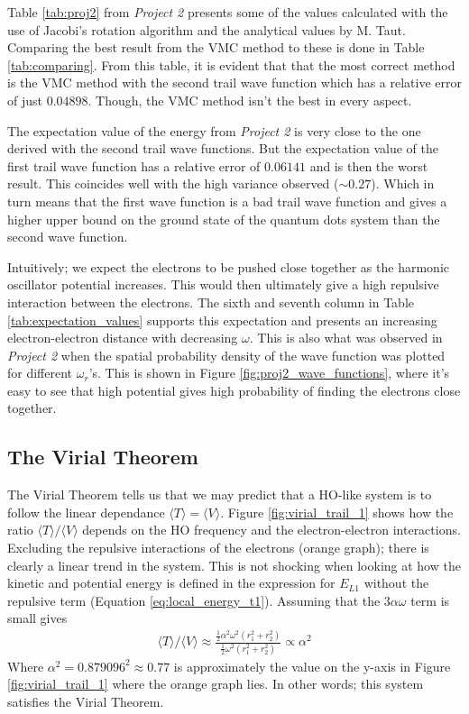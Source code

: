 \documentclass[12pt,english,a4paper]{article}
\begin{document}
Table \ref{tab:proj2} from \textit{Project 2} presents some of the values calculated with the use of Jacobi's rotation algorithm and the analytical values by M. Taut. Comparing the best result from the VMC method to these is done in Table \ref{tab:comparing}. From this table, it is evident that that the most correct method is the VMC method with the second trail wave function which has a relative error of just $0.04898$. Though, the VMC method isn't the best in every aspect.

The expectation value of the energy from \textit{Project 2} is very close to the one derived with the second trail wave functions. But the expectation value of the first trail wave function has a relative error of $0.06141$ and is then the worst result. This coincides well with the high variance observed ($\sim 0.27$). Which in turn means that the first wave function is a bad trail wave function and gives a higher upper bound on the ground state of the quantum dots system than the second wave function.

Intuitively; we expect the electrons to be pushed close together as the harmonic oscillator potential increases. This would then ultimately give a high repulsive interaction between the electrons. The sixth and seventh column in Table \ref{tab:expectation_values} supports this expectation and presents an increasing electron-electron distance with decreasing $\omega$. This is also what was observed in \textit{Project 2} when the spatial probability density of the wave function was plotted for different $\omega_r$'s. This is shown in Figure \ref{fig:proj2_wave_functions}, where it's easy to see that high potential gives high probability of finding the electrons close together.

\subsection{The Virial Theorem} \label{section:discussion:virial}
The Virial Theorem tells us that we may predict that a HO-like system is to follow the linear dependance $\langle T\rangle = \langle V\rangle$. Figure \ref{fig:virial_trail_1} shows how the ratio $\langle T\rangle /\langle V\rangle$ depends on the HO frequency and the electron-electron interactions. Excluding the repulsive interactions of the electrons (orange graph); there is clearly a linear trend in the system. This is not shocking when looking at how the kinetic and potential energy is defined in the expression for $E_{L1}$ without the repulsive term (Equation \eqref{eq:local_energy_t1}). Assuming that the $3\alpha\omega$ term is small gives
\begin{align*}
    \langle T\rangle /\langle V\rangle \approx \frac{\frac{1}{2}\alpha^2\omega^2\left(r_1^2+r_2^2\right)}{\frac{1}{2}\omega^2\left(r_1^2+r_2^2\right)} \propto \alpha^2
\end{align*}
Where $\alpha^2=0.879096^2\approx 0.77$ is approximately the value on the y-axis in Figure \ref{fig:virial_trail_1} where the orange graph lies. In other words; this system satisfies the Virial Theorem.
\end{document}
